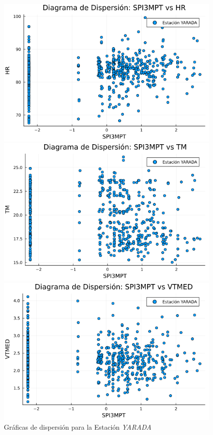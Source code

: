 \begin{figure}[htbp]
\centering
\caption{Gráficas de dispersión para la Estación \textit{YARADA}}
\begin{minipage}{0.32\textwidth}
    \centering
    \includegraphics[width=\linewidth]{Capitulos/Scaterplot/YARADA_SPI3MPT_vs_HR.png}
\end{minipage}\hfill
\begin{minipage}{0.32\textwidth}
    \centering
    \includegraphics[width=\linewidth]{Capitulos/Scaterplot/YARADA_SPI3MPT_vs_TM.png}
\end{minipage}\hfill
\begin{minipage}{0.32\textwidth}
    \centering
    \includegraphics[width=\linewidth]{Capitulos/Scaterplot/YARADA_SPI3MPT_vs_VTMED.png}

\end{minipage}
\end{figure}
